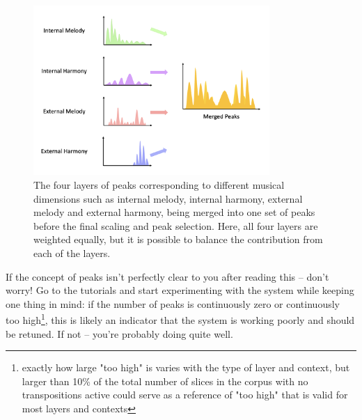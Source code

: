 
 \begin{figure}[h]
    \centering        
 	\includegraphics[width=0.8\textwidth]{img/peaks_merge_2-5.png}
    \caption{The four layers of peaks corresponding to different musical dimensions such as internal melody, internal harmony, external melody and external harmony, being merged into one set of peaks before the final scaling and peak selection. Here, all four layers are weighted equally, but it is possible to balance the contribution from each of the layers.}
    \label{fig:peakmerge}
\end{figure}

If the concept of peaks isn't perfectly clear to you after reading this – don't worry! Go to the tutorials and start experimenting with the system while keeping one thing in mind: if the number of peaks is continuously zero or continuously too high\footnote{exactly how large "too high" is varies with the type of layer and context, but larger than 10\% of the total number of slices in the corpus with no transpositions active could serve as a reference of "too high" that is valid for most layers and contexts}, this is likely an indicator that the system is working poorly and should be retuned. If not – you're probably doing quite well.

